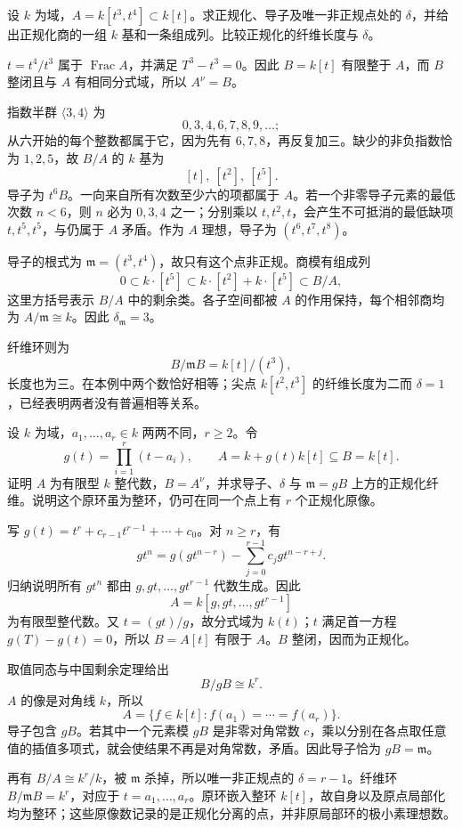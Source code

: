\begin{exercise}\label{g5:ex:semigroup-three-four}
	设 \(k\) 为域，\(A=k[t^3,t^4]\subset k[t]\)。求正规化、导子及唯一非正规点处的 \(\delta\)，并给出正规化商的一组 \(k\) 基和一条组成列。比较正规化的纤维长度与 \(\delta\)。
\end{exercise}
\begin{solution}
	\(t=t^4/t^3\) 属于 \(\operatorname{Frac}A\)，并满足 \(T^3-t^3=0\)。因此 \(B=k[t]\) 有限整于 \(A\)，而 \(B\) 整闭且与 \(A\) 有相同分式域，所以 \(A^\nu=B\)。

	指数半群 \(\langle3,4\rangle\) 为
	\[
		0,3,4,6,7,8,9,\ldots;
	\]
	从六开始的每个整数都属于它，因为先有 \(6,7,8\)，再反复加三。缺少的非负指数恰为 \(1,2,5\)，故 \(B/A\) 的 \(k\) 基为
	\[
		[t],\ [t^2],\ [t^5].
	\]
	导子为 \(t^6B\)。一向来自所有次数至少六的项都属于 \(A\)。若一个非零导子元素的最低次数 \(n<6\)，则 \(n\) 必为 \(0,3,4\) 之一；分别乘以 \(t,t^2,t\)，会产生不可抵消的最低缺项 \(t,t^5,t^5\)，与仍属于 \(A\) 矛盾。作为 \(A\) 理想，导子为 \((t^6,t^7,t^8)\)。

	导子的根式为 \(\mathfrak m=(t^3,t^4)\)，故只有这个点非正规。商模有组成列
	\[
		0\subset k\cdot[t^5]\subset k\cdot[t^2]+k\cdot[t^5]
		\subset B/A,
	\]
	这里方括号表示 \(B/A\) 中的剩余类。各子空间都被 \(A\) 的作用保持，每个相邻商均为 \(A/\mathfrak m\cong k\)。因此 \(\delta_{\mathfrak m}=3\)。

	纤维环则为
	\[
		B/\mathfrak mB=k[t]/(t^3),
	\]
	长度也为三。在本例中两个数恰好相等；尖点 \(k[t^2,t^3]\) 的纤维长度为二而 \(\delta=1\)，已经表明两者没有普遍相等关系。
\end{solution}

\begin{exercise}\label{g5:ex:identify-many-points}
	设 \(k\) 为域，\(a_1,\ldots,a_r\in k\) 两两不同，\(r\geq2\)。令
	\[
		g(t)=\prod_{i=1}^r(t-a_i),\qquad
		A=k+g(t)k[t]\subseteq B=k[t].
	\]
	证明 \(A\) 为有限型 \(k\) 整代数，\(B=A^\nu\)，并求导子、\(\delta\) 与 \(\mathfrak m=gB\) 上方的正规化纤维。说明这个原环虽为整环，仍可在同一个点上有 \(r\) 个正规化原像。
\end{exercise}
\begin{solution}
	写 \(g(t)=t^r+c_{r-1}t^{r-1}+\cdots+c_0\)。对 \(n\geq r\)，有
	\[
		gt^n=g(gt^{n-r})-\sum_{j=0}^{r-1}c_jgt^{n-r+j}.
	\]
	归纳说明所有 \(gt^n\) 都由 \(g,gt,\ldots,gt^{r-1}\) 代数生成。因此
	\[
		A=k[g,gt,\ldots,gt^{r-1}]
	\]
	为有限型整代数。又 \(t=(gt)/g\)，故分式域为 \(k(t)\)；\(t\) 满足首一方程 \(g(T)-g(t)=0\)，所以 \(B=A[t]\) 有限于 \(A\)。\(B\) 整闭，因而为正规化。

	取值同态与中国剩余定理给出
	\[
		B/gB\cong k^r.
	\]
	\(A\) 的像是对角线 \(k\)，所以
	\[
		A=\{f\in k[t]:f(a_1)=\cdots=f(a_r)\}.
	\]
	导子包含 \(gB\)。若其中一个元素模 \(gB\) 是非零对角常数 \(c\)，乘以分别在各点取任意值的插值多项式，就会使结果不再是对角常数，矛盾。因此导子恰为 \(gB=\mathfrak m\)。

	再有 \(B/A\cong k^r/k\)，被 \(\mathfrak m\) 杀掉，所以唯一非正规点的 \(\delta=r-1\)。纤维环 \(B/\mathfrak mB=k^r\)，对应于 \(t=a_1,\ldots,a_r\)。原环嵌入整环 \(k[t]\)，故自身以及原点局部化均为整环；这些原像数记录的是正规化分离的点，并非原局部环的极小素理想数。
\end{solution}


